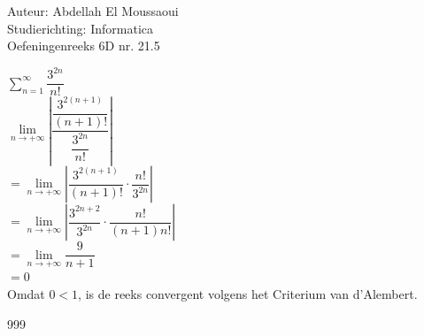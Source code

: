 \documentclass[a4paper]{article}
\begin{document}
  
\noindent \large Auteur: Abdellah El Moussaoui \\
\noindent \large Studierichting: Informatica\\
\noindent \large Oefeningenreeks 6D nr. 21.5\\

\medskip

\normalsize


$\displaystyle\sum_{n=1}^{\infty}\dfrac{3^{2n}}{n!}$\\

$ \lim\limits_{n\to+\infty} \left| \dfrac{\dfrac{3^{2\left( n + 1\right)}}{(n+1)!}}{\dfrac{3^{2n}}{n!}} \right| $\\

$= \lim\limits_{n\to+\infty} \left| \dfrac{3^{2\left( n + 1\right)}}{(n+1)!} \cdot \dfrac{n!}{3^{2n}} \right| $\\

$= \lim\limits_{n\to+\infty} \left| \dfrac{3^{2n+2}}{3^{2n}} \cdot \dfrac{n!}{(n+1)n!} \right| $\\

$= \lim\limits_{n\to+\infty} \dfrac{9}{n+1}$\\

$= 0$\\

Omdat $0 < 1$, is de reeks convergent volgens het Criterium van d'Alembert.\\


\begin{thebibliography}{999}
\end{thebibliography}
\end{document}
